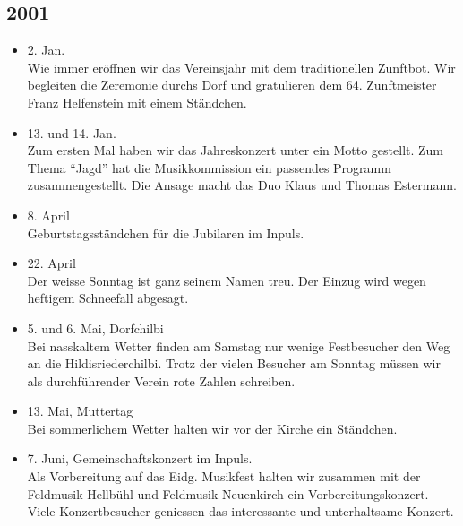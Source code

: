 \subsection{2001}
\begin{history}

    \begin{itemize}

        \item 2. Jan.\\
              Wie immer eröffnen wir das Vereinsjahr mit dem traditionellen Zunftbot.
              Wir begleiten die Zeremonie durchs Dorf und gratulieren dem 64.
              Zunftmeister Franz Helfenstein mit einem Ständchen.

        \item 13. und 14. Jan.\\
              Zum ersten Mal haben wir das Jahreskonzert unter ein Motto gestellt. Zum
              Thema \enquote{Jagd} hat die Musikkommission ein passendes Programm
              zusammengestellt. Die Ansage macht das Duo Klaus und Thomas Estermann.

        \item 8. April\\
              Geburtstagsständchen für die Jubilaren im Inpuls.

        \item 22. April\\
              Der weisse Sonntag ist ganz seinem Namen treu. Der Einzug wird wegen
              heftigem Schneefall abgesagt.

        \item 5. und 6. Mai, Dorfchilbi\\
              Bei nasskaltem Wetter finden am Samstag nur wenige Festbesucher den Weg
              an die Hildisriederchilbi. Trotz der vielen Besucher am Sonntag müssen
              wir als durchführender Verein rote Zahlen schreiben.

        \item 13. Mai, Muttertag\\
              Bei sommerlichem Wetter halten wir vor der Kirche ein Ständchen.

        \item 7. Juni,  Gemeinschaftskonzert im Inpuls. \\
              Als Vorbereitung auf das Eidg. Musikfest halten wir zusammen mit der
              Feldmusik Hellbühl und Feldmusik Neuenkirch ein Vorbereitungskonzert.
              Viele Konzertbesucher geniessen das interessante und unterhaltsame
              Konzert.


\end{itemize}
\end{history}
